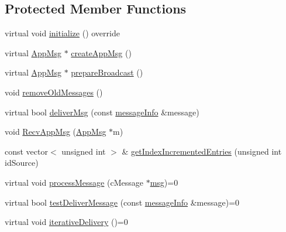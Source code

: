 \subsection*{Protected Member Functions}
\begin{DoxyCompactItemize}
\item 
virtual void \hyperlink{class_node_with_control_a08c8e80fd67b52c51c642d7c66fe729c}{initialize} () override
\item 
virtual \hyperlink{class_app_msg}{App\+Msg} $\ast$ \hyperlink{class_node_with_control_a7772568c2836f5f204952ebe659e0049}{create\+App\+Msg} ()
\item 
virtual \hyperlink{class_app_msg}{App\+Msg} $\ast$ \hyperlink{class_node_with_control_ab871014cf3f42d834f8d34ad5498174c}{prepare\+Broadcast} ()
\item 
void \hyperlink{class_node_with_control_add681efe156d989a717d2cd979f5ac9f}{remove\+Old\+Messages} ()
\item 
virtual bool \hyperlink{class_node_with_control_aada7451be61be592b27188b6249afef2}{deliver\+Msg} (const \hyperlink{structures_8h_a7e7bdc1d2fff8a9436f2f352b2711ed6}{message\+Info} \&message)
\item 
void \hyperlink{class_node_with_control_ae177f5f64edcc09a3875e5afdc82edd2}{Recv\+App\+Msg} (\hyperlink{class_app_msg}{App\+Msg} $\ast$m)
\item 
const vector$<$ unsigned int $>$ \& \hyperlink{class_node_with_control_acf1daba46cfa16eb2bd7cbd399c2624b}{get\+Index\+Incremented\+Entries} (unsigned int id\+Source)
\item 
virtual void \hyperlink{class_node_with_control_af532082fab76c38d8c50ca90e991f4c3}{process\+Message} (c\+Message $\ast$\hyperlink{_controller_8h_afa0f3b802fbc219228f7bb97996fa558}{msg})=0
\item 
virtual bool \hyperlink{class_node_with_control_a84df0beabbaed80e7da017d592480515}{test\+Deliver\+Message} (const \hyperlink{structures_8h_a7e7bdc1d2fff8a9436f2f352b2711ed6}{message\+Info} \&message)=0
\item 
virtual void \hyperlink{class_node_with_control_a4f78078272b90937e0746c797443b37d}{iterative\+Delivery} ()=0
\end{DoxyCompactItemize}
